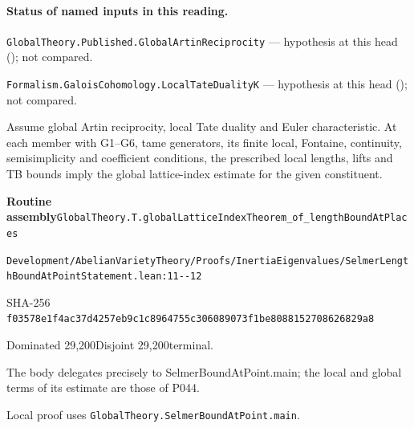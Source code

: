 

\paragraph{Status of named inputs in this reading.}
\noindent\nolinkurl{GlobalTheory.Published.GlobalArtinReciprocity} --- hypothesis at this head (); not compared.\par
\noindent\nolinkurl{Formalism.GaloisCohomology.LocalTateDualityK} --- hypothesis at this head (); not compared.\par

\begin{formalstatement}[D002]\label{decomp:D002}
Assume global Artin reciprocity, local Tate duality and Euler characteristic. At each member with G1–G6, tame generators, its finite local, Fontaine, continuity, semisimplicity and coefficient conditions, the prescribed local lengths, lifts and TB bounds imply the global lattice-index estimate for the given constituent.
\end{formalstatement}
{\small\raggedright\noindent\textsf{\bfseries Routine assembly}\quad \nolinkurl{GlobalTheory.T.globalLatticeIndexTheorem_of_lengthBoundAtPlaces}\par\noindent \nolinkurl{Development/AbelianVarietyTheory/Proofs/InertiaEigenvalues/SelmerLengthBoundAtPointStatement.lean:11--12}\par\noindent SHA-256 \nolinkurl{f03578e1f4ac37d4257eb9c1c8964755c306089073f1be8088152708626829a8}\par\noindent Dominated 29,200\quad Disjoint 29,200\quad terminal.\par}
The body delegates precisely to SelmerBoundAtPoint.main; the local and global terms of its estimate are those of P044.
{\small\raggedright Local proof uses \nolinkurl{GlobalTheory.SelmerBoundAtPoint.main}.\par}
